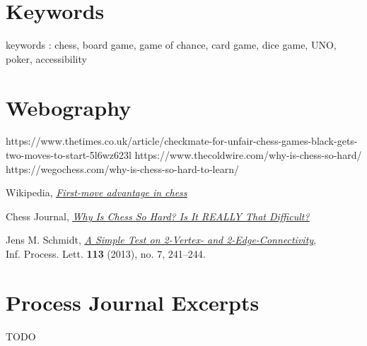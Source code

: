 \documentclass[12pt]{article}
\begin{document}
    \section{Keywords}
        keywords : chess, board game, game of chance, card game, dice game, UNO, poker, accessibility
    
    \section{Webography}
        https://www.thetimes.co.uk/article/checkmate-for-unfair-chess-games-black-gets-two-moves-to-start-5l6wz623l
        https://www.thecoldwire.com/why-is-chess-so-hard/
        https://wegochess.com/why-is-chess-so-hard-to-learn/
        
        \begin{thebibliography}{9}
                Wikipedia, \textit{\href{https://en.wikipedia.org/wiki/First-move_advantage_in_chess}{\underline{First-move advantage in chess}} }
                
                Chess Journal, \textit{\href{https://www.chessjournal.com/why-is-chess-so-hard/}{\underline{Why Is Chess So Hard? Is It REALLY That Difficult?}} }
            
                Jens M. Schmidt, \href{https://arxiv.org/ftp/arxiv/papers/1209/1209.0700.pdf}{\underline{\textit{A Simple Test on 2-Vertex- and 2-Edge-Connectivity}}},
                \\Inf. Process. Lett. \textbf{113} (2013), no. 7, 241–244.
        \end{thebibliography}
    \section{Process Journal Excerpts}
        TODO
    
\end{document}
